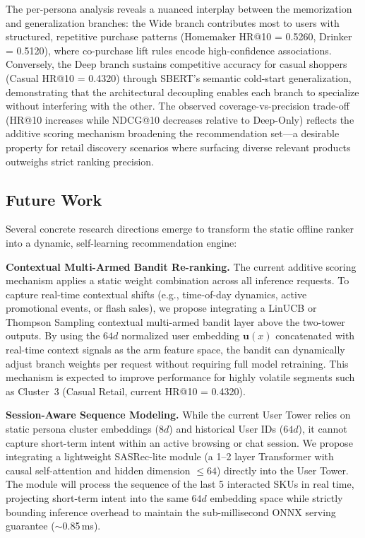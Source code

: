 \documentclass[10pt,conference]{IEEEtran}
\begin{document}
The per-persona analysis reveals a nuanced interplay between the memorization and generalization branches: the Wide branch contributes most to users with structured, repetitive purchase patterns (Homemaker HR@10 = 0.5260, Drinker = 0.5120), where co-purchase lift rules encode high-confidence associations. Conversely, the Deep branch sustains competitive accuracy for casual shoppers (Casual HR@10 = 0.4320) through SBERT's semantic cold-start generalization, demonstrating that the architectural decoupling enables each branch to specialize without interfering with the other. The observed coverage-vs-precision trade-off (HR@10 increases while NDCG@10 decreases relative to Deep-Only) reflects the additive scoring mechanism broadening the recommendation set---a desirable property for retail discovery scenarios where surfacing diverse relevant products outweighs strict ranking precision.

\subsection{Future Work}

Several concrete research directions emerge to transform the static offline ranker into a dynamic, self-learning recommendation engine:

\textbf{Contextual Multi-Armed Bandit Re-ranking.} The current additive scoring mechanism applies a static weight combination across all inference requests. To capture real-time contextual shifts (e.g., time-of-day dynamics, active promotional events, or flash sales), we propose integrating a LinUCB or Thompson Sampling contextual multi-armed bandit layer above the two-tower outputs. By using the $64d$ normalized user embedding $\mathbf{u}(x)$ concatenated with real-time context signals as the arm feature space, the bandit can dynamically adjust branch weights per request without requiring full model retraining. This mechanism is expected to improve performance for highly volatile segments such as Cluster~3 (Casual Retail, current HR@10 = 0.4320).

\textbf{Session-Aware Sequence Modeling.} While the current User Tower relies on static persona cluster embeddings ($8d$) and historical User IDs ($64d$), it cannot capture short-term intent within an active browsing or chat session. We propose integrating a lightweight SASRec-lite module (a 1--2 layer Transformer with causal self-attention and hidden dimension $\le 64$) directly into the User Tower. The module will process the sequence of the last 5 interacted SKUs in real time, projecting short-term intent into the same $64d$ embedding space while strictly bounding inference overhead to maintain the sub-millisecond ONNX serving guarantee ($\sim$0.85\,ms).
\end{document}
